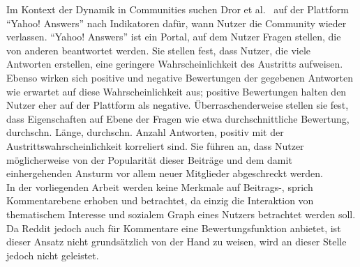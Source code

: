 \documentclass[11pt,a4paper,twoside]{article}
\begin{document}
Im Kontext der Dynamik in Communities suchen Dror et
al.~\autocite{Dror2012} auf der Plattform \enquote{Yahoo! Answers} nach
Indikatoren dafür, wann Nutzer die Community wieder verlassen.
\enquote{Yahoo! Answers} ist ein Portal, auf dem Nutzer Fragen stellen,
die von anderen beantwortet werden. Sie stellen fest, dass Nutzer, die
viele Antworten erstellen, eine geringere Wahrscheinlichkeit des
Austritts aufweisen. Ebenso wirken sich positive und negative
Bewertungen der gegebenen Antworten wie erwartet auf diese
Wahrscheinlichkeit aus; positive Bewertungen halten den Nutzer eher auf
der Plattform als negative. Überraschenderweise stellen sie fest, dass
Eigenschaften auf Ebene der Fragen wie etwa durchschnittliche Bewertung,
durchschn. Länge, durchschn. Anzahl Antworten, positiv mit der
Austrittswahrscheinlichkeit korreliert sind. Sie führen an, dass Nutzer
möglicherweise von der Popularität dieser Beiträge und dem damit
einhergehenden Ansturm vor allem neuer Mitglieder abgeschreckt werden.\\
In der vorliegenden Arbeit werden keine Merkmale auf Beitrags-, sprich
Kommentarebene erhoben und betrachtet, da einzig die Interaktion von
thematischem Interesse und sozialem Graph eines Nutzers betrachtet
werden soll. Da Reddit jedoch auch für Kommentare eine
Bewertungsfunktion anbietet, ist dieser Ansatz nicht grundsätzlich von
der Hand zu weisen, wird an dieser Stelle jedoch nicht geleistet.
\end{document}
